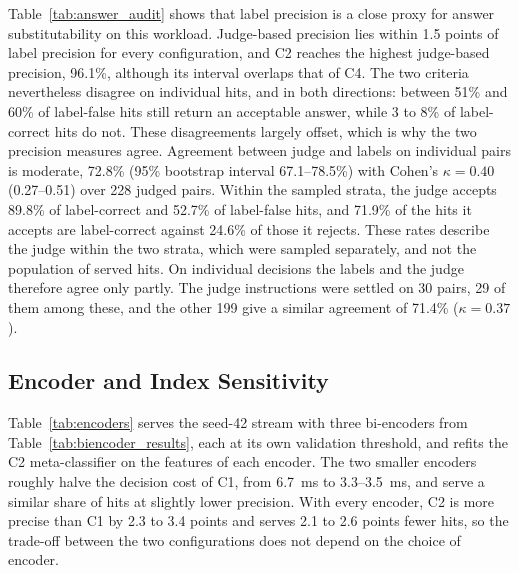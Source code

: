 \documentclass[authoryear,preprint,review,12pt]{elsarticle}
\begin{document}
Table~\ref{tab:answer_audit} shows that label precision is a close proxy for answer substitutability on this workload. Judge-based precision lies within 1.5 points of label precision for every configuration, and C2 reaches the highest judge-based precision, 96.1\%, although its interval overlaps that of C4. The two criteria nevertheless disagree on individual hits, and in both directions: between 51\% and 60\% of label-false hits still return an acceptable answer, while 3 to 8\% of label-correct hits do not. These disagreements largely offset, which is why the two precision measures agree. Agreement between judge and labels on individual pairs is moderate, 72.8\% (95\% bootstrap interval 67.1--78.5\%) with Cohen's $\kappa=0.40$ (0.27--0.51) over 228 judged pairs. Within the sampled strata, the judge accepts 89.8\% of label-correct and 52.7\% of label-false hits, and 71.9\% of the hits it accepts are label-correct against 24.6\% of those it rejects. These rates describe the judge within the two strata, which were sampled separately, and not the population of served hits. On individual decisions the labels and the judge therefore agree only partly. The judge instructions were settled on 30 pairs, 29 of them among these, and the other 199 give a similar agreement of 71.4\% ($\kappa=0.37$).

\subsection{Encoder and Index Sensitivity}
\label{subsec:encoder_index}
Table~\ref{tab:encoders} serves the seed-42 stream with three bi-encoders from Table~\ref{tab:biencoder_results}, each at its own validation threshold, and refits the C2 meta-classifier on the features of each encoder. The two smaller encoders roughly halve the decision cost of C1, from 6.7~ms to 3.3--3.5~ms, and serve a similar share of hits at slightly lower precision. With every encoder, C2 is more precise than C1 by 2.3 to 3.4 points and serves 2.1 to 2.6 points fewer hits, so the trade-off between the two configurations does not depend on the choice of encoder.
\end{document}
